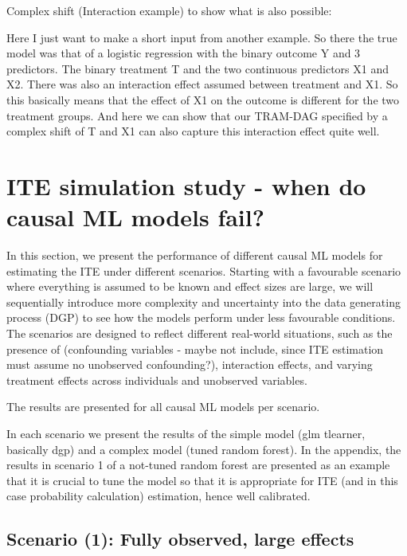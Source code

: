 Complex shift (Interaction example) to show what is also possible:

Here I just want to make a short input from another example. So there the true model was that of a logistic regression with the binary outcome Y and 3 predictors. The binary treatment T and the two continuous predictors X1 and X2. There was also an interaction effect assumed between treatment and X1. So this basically means that the effect of X1 on the outcome is different for the two treatment groups.
And here we can show that our TRAM-DAG specified by a complex shift of T and X1 can also capture this interaction effect quite well.


\section{ITE simulation study - when do causal ML models fail?}

In this section, we present the performance of different causal ML models for estimating the ITE under different scenarios. Starting with a favourable scenario where everything is assumed to be known and effect sizes are large, we will sequentially introduce more complexity and uncertainty into the data generating process (DGP) to see how the models perform under less favourable conditions. The scenarios are designed to reflect different real-world situations, such as the presence of (confounding variables - maybe not include, since ITE estimation must assume no unobserved confounding?), interaction effects, and varying treatment effects across individuals and unobserved variables.

The results are presented for all causal ML models per scenario.

In each scenario we present the results of the simple model (glm tlearner, basically dgp) and a complex model (tuned random forest). In the appendix, the results in scenario 1 of a not-tuned random forest are presented as an example that it is crucial to tune the model so that it is appropriate for ITE (and in this case probability calculation) estimation, hence well calibrated.


\subsection{Scenario (1): Fully observed, large effects}



